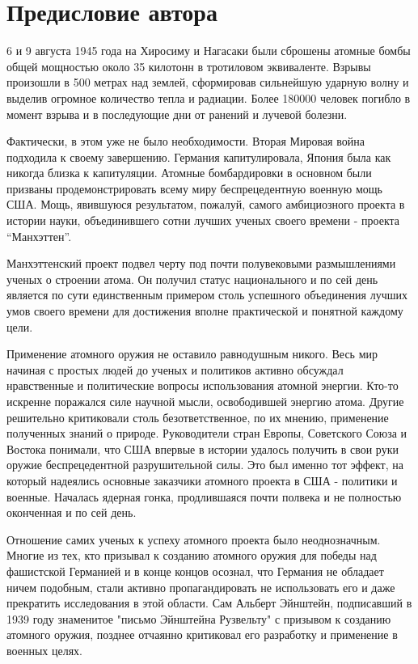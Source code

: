 \chapter*{Предисловие автора}

6 и 9 августа 1945 года на Хиросиму и Нагасаки были сброшены атомные бомбы общей мощностью около 35 килотонн в тротиловом эквиваленте.
Взрывы произошли в 500 метрах над землей, сформировав сильнейшую ударную волну и выделив огромное количество тепла и радиации.
Более 180000 человек погибло в момент взрыва и в последующие дни от ранений и лучевой болезни.  

Фактически, в этом уже не было необходимости. 
Вторая Мировая война подходила к своему завершению. 
Германия капитулировала, Япония была как никогда близка к капитуляции.
Атомные бомбардировки в основном были призваны продемонстрировать всему миру беспрецедентную военную мощь США. 
Мощь, явившуюся результатом, пожалуй, самого амбициозного проекта в истории науки, объединившего сотни лучших ученых своего времени - проекта ``Манхэттен''. 

Манхэттенский проект подвел черту под почти полувековыми размышлениями ученых о строении атома. 
Он получил статус национального и по сей день является по сути единственным примером столь успешного объединения лучших умов своего времени для достижения вполне практической и понятной каждому цели.

Применение атомного оружия не оставило равнодушным никого.
Весь мир начиная с простых людей до ученых и политиков активно обсуждал нравственные и политические вопросы использования атомной энергии.
Кто-то искренне поражался силе научной мысли, освободившей энергию атома.
Другие решительно критиковали столь безответственное, по их мнению, применение полученных знаний о природе.
Руководители стран Европы, Советского Союза и Востока понимали, что США впервые в истории удалось получить в свои руки оружие беспрецедентной разрушительной силы. 
Это был именно тот эффект, на который надеялись основные заказчики атомного проекта в США - политики и военные.  
Началась ядерная гонка, продлившаяся почти полвека и не полностью оконченная и по сей день.

Отношение самих ученых к успеху атомного проекта было неоднозначным.
Многие из тех, кто призывал к созданию атомного оружия для победы над фашистской Германией и в конце концов осознал, что Германия не обладает ничем подобным, стали активно пропагандировать не использовать его и даже прекратить исследования в этой области. 
Сам Альберт Эйнштейн, подписавший в 1939 году знаменитое "письмо Эйнштейна Рузвельту" с призывом к созданию атомного оружия, позднее отчаянно критиковал его разработку и применение в военных целях.

